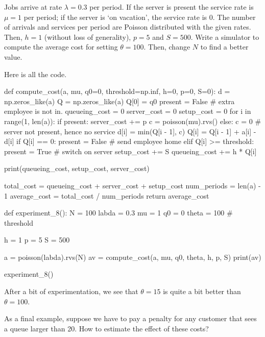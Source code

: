 \begin{exercise}
  Jobs arrive at rate $\lambda=0.3$ per period.
  If the server is present the service rate is $\mu=1$ per period; if the server is `on vacation', the service rate is 0.
  The number of arrivals and services per period are Poisson distributed with the given rates.
  Then, $h=1$ (without loss of generality), $p=5$ and $S=500$.
  Write a simulator to compute the average cost for setting $\theta=100$.
  Then, change $N$ to find a better value.

\begin{solution}
Here is all the code.
\begin{pyverbatim}
def compute_cost(a, mu, q0=0, threshold=np.inf, h=0, p=0, S=0):
    d = np.zeros_like(a)
    Q = np.zeros_like(a)
    Q[0] = q0
    present = False  # extra employee is not in.
    queueing_cost = 0
    server_cost = 0
    setup_cost = 0
    for i in range(1, len(a)):
        if present:
            server_cost += p
            c = poisson(mu).rvs()
        else:
            c = 0  # server not present, hence no service
        d[i] = min(Q[i - 1], c)
        Q[i] = Q[i - 1] + a[i] - d[i]
        if Q[i] == 0:
            present = False  # send employee home
        elif Q[i] >= threshold:
            present = True  # switch on server
            setup_cost += S
        queueing_cost += h * Q[i]

    print(queueing_cost, setup_cost, server_cost)

    total_cost = queueing_cost + server_cost + setup_cost
    num_periods = len(a) - 1
    average_cost = total_cost / num_periods
    return average_cost


def experiment_8():
    N = 100
    labda = 0.3
    mu = 1
    q0 = 0
    theta = 100  # threshold

    h = 1
    p = 5
    S = 500

    a = poisson(labda).rvs(N)
    av = compute_cost(a, mu, q0, theta, h, p, S)
    print(av)


experiment_8()
\end{pyverbatim}
After a bit of experimentation, we see that $\theta=15$ is quite a bit better than $\theta=100$.

\end{solution}
\end{exercise}


As a final example, suppose we have to pay a penalty for any customer that sees a queue larger than 20. How to estimate the effect of these costs? 


